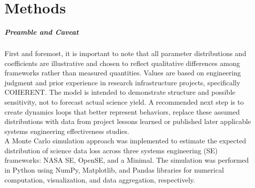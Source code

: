 \chapter{Methods}
\label{chapter:methods}
\paragraph{Preamble and Caveat} First and foremost, it is important to note that all parameter distributions and coefficients are illustrative and chosen to reflect qualitative differences among frameworks rather than measured quantities.
Values are based on engineering judgment and prior experience in research infrastructure projects, specifically COHERENT.
The model is intended to demonstrate structure and possible sensitivity, not to forecast actual science yield.
A recommended next step is to create dynamics loops that better represent behaviors, replace these assumed distributions with data from project lessons learned or
published later applicable systems engineering effectiveness studies.\\

A Monte Carlo simulation approach was implemented to estimate the expected distribution of science data loss across three systems engineering (SE) frameworks: NASA SE, OpenSE, and a Minimal. 
The simulation was performed in Python using NumPy, Matplotlib, and Pandas libraries for numerical computation, visualization, and data aggregation, respectively.

